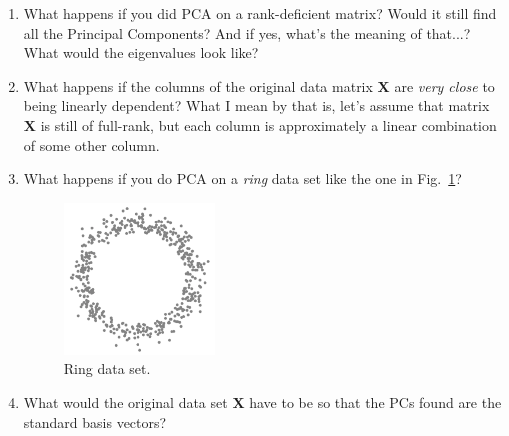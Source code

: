 \documentclass[10pt,twocolumn]{article}
\begin{document}
\begin{enumerate}
\item What happens if you did PCA on a rank-deficient matrix? Would it still find all the Principal Components? And if yes, what's the meaning of that...? What would the eigenvalues look like?
\item What happens if the columns of the original data matrix $\mathbf{X}$ are \textit{very close} to being linearly dependent? What I mean by that is, let's assume that matrix $\mathbf{X}$ is still of full-rank, but each column is approximately a linear combination of some other column.
\item What happens if you do PCA on a \textit{ring} data set like the one in Fig.~\ref{fig:ring-data-set}?
\begin{figure}[H]
\centering\includegraphics[width=4cm]{ring-data-set.png}
\caption{Ring data set.}
\label{fig:ring-data-set}
\end{figure}
\item What would the original data set $\mathbf{X}$ have to be so that the PCs found are the standard basis vectors?
\end{enumerate}






\thebibliography{}
\end{document}
